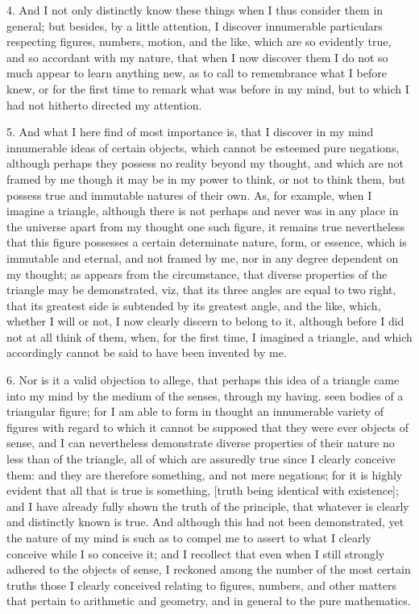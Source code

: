 4. And I not only distinctly know these things when I thus consider them in general; but besides, by a little attention, I discover innumerable particulars respecting figures, numbers, motion, and the like, which are so evidently true, and so accordant with my nature, that when I now discover them I do not so much appear to learn anything new, as to call to remembrance what I before knew, or for the first time to remark what was before in my mind, but to which I had not hitherto directed my attention.

5. And what I here find of most importance is, that I discover in my mind innumerable ideas of certain objects, which cannot be esteemed pure negations, although perhaps they possess no reality beyond my thought, and which are not framed by me though it may be in my power to think, or not to think them, but possess true and immutable natures of their own. As, for example, when I imagine a triangle, although there is not perhaps and never was in any place in the universe apart from my thought one such figure, it remains true nevertheless that this figure possesses a certain determinate nature, form, or essence, which is immutable and eternal, and not framed by me, nor in any degree dependent on my thought; as appears from the circumstance, that diverse properties of the triangle may be demonstrated, viz, that its three angles are equal to two right, that its greatest side is subtended by its greatest angle, and the like, which, whether I will or not, I now clearly discern to belong to it, although before I did not at all think of them, when, for the first time, I imagined a triangle, and which accordingly cannot be said to have been invented by me.

6. Nor is it a valid objection to allege, that perhaps this idea of a triangle came into my mind by the medium of the senses, through my having. seen bodies of a triangular figure; for I am able to form in thought an innumerable variety of figures with regard to which it cannot be supposed that they were ever objects of sense, and I can nevertheless demonstrate diverse properties of their nature no less than of the triangle, all of which are assuredly true since I clearly conceive them: and they are therefore something, and not mere negations; for it is highly evident that all that is true is something, [truth being identical with existence]; and I have already fully shown the truth of the principle, that whatever is clearly and distinctly known is true. And although this had not been demonstrated, yet the nature of my mind is such as to compel me to assert to what I clearly conceive while I so conceive it; and I recollect that even when I still strongly adhered to the objects of sense, I reckoned among the number of the most certain truths those I clearly conceived relating to figures, numbers, and other matters that pertain to arithmetic and geometry, and in general to the pure mathematics.

